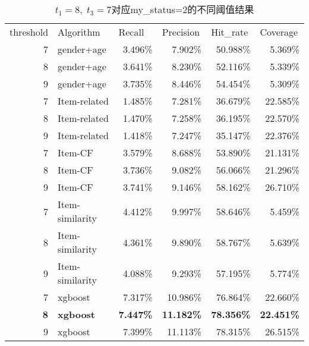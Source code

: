 \begin{table}[htbp]
  \centering
  \caption{$t_1=8,\;t_3=7$对应my\_status=2的不同阈值结果}
    \begin{tabular}{rlrrrr}
    \toprule
    \multicolumn{1}{l}{threshold} & Algorithm & \multicolumn{1}{l}{Recall} & \multicolumn{1}{l}{Precision} & \multicolumn{1}{l}{Hit\_rate} & \multicolumn{1}{l}{Coverage} \\
    7    & gender+age & 3.496\% & 7.902\% & 50.988\% & 5.369\% \\
    8    & gender+age & 3.641\% & 8.230\% & 52.116\% & 5.339\% \\
    9    & gender+age & 3.735\% & 8.446\% & 54.454\% & 5.309\% \\
    7    & Item-related & 1.485\% & 7.281\% & 36.679\% & 22.585\% \\
    8    & Item-related & 1.470\% & 7.258\% & 36.195\% & 22.570\% \\
    9    & Item-related & 1.418\% & 7.247\% & 35.147\% & 22.376\% \\
    7    & Item-CF & 3.579\% & 8.688\% & 53.890\% & 21.131\% \\
    8    & Item-CF & 3.736\% & 9.082\% & 56.066\% & 21.296\% \\
    9    & Item-CF & 3.741\% & 9.146\% & 58.162\% & 26.710\% \\
    7    & Item-similarity & 4.412\% & 9.997\% & 58.646\% & 5.459\% \\
    8    & Item-similarity & 4.361\% & 9.890\% & 58.767\% & 5.639\% \\
    9    & Item-similarity & 4.088\% & 9.293\% & 57.195\% & 5.774\% \\
    7    & xgboost & 7.317\% & 10.986\% & 76.864\% & 22.660\% \\
    \textbf{8} & \textbf{xgboost} & \textbf{7.447\%} & \textbf{11.182\%} & \textbf{78.356\%} & \textbf{22.451\%} \\
    9    & xgboost & 7.399\% & 11.113\% & 78.315\% & 26.515\% \\
    \bottomrule
    \end{tabular}%
  \label{tab:8x78}%
\end{table}%

